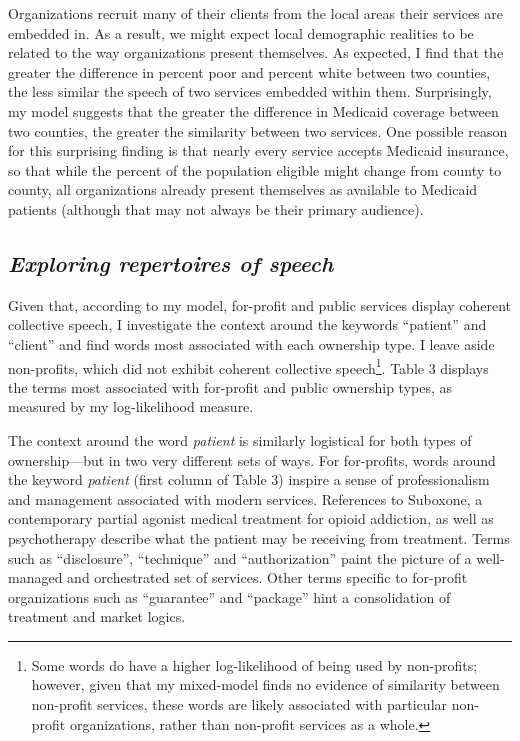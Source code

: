 \documentclass[
  12pt,
]{article}
\begin{document}
\vspace{12pt}

Organizations recruit many of their clients from the local areas their services are embedded in. As a result, we might expect local demographic realities to be related to the way organizations present themselves. As expected, I find that the greater the difference in percent poor and percent white between two counties, the less similar the speech of two services embedded within them. Surprisingly, my model suggests that the greater the difference in Medicaid coverage between two counties, the greater the similarity between two services. One possible reason for this surprising finding is that nearly every service accepts Medicaid insurance, so that while the percent of the population eligible might change from county to county, all organizations already present themselves as available to Medicaid patients (although that may not always be their primary audience).

\vspace{12pt}

\hypertarget{exploring-repertoires-of-speech}{%
\subsection{\texorpdfstring{\emph{Exploring repertoires of speech}}{Exploring repertoires of speech}}\label{exploring-repertoires-of-speech}}

Given that, according to my model, for-profit and public services display coherent collective speech, I investigate the context around the keywords ``patient'' and ``client'' and find words most associated with each ownership type. I leave aside non-profits, which did not exhibit coherent collective speech\footnote{Some words do have a higher log-likelihood of being used by non-profits; however, given that my mixed-model finds no evidence of similarity between non-profit services, these words are likely associated with particular non-profit organizations, rather than non-profit services as a whole.}. Table 3 displays the terms most associated with for-profit and public ownership types, as measured by my log-likelihood measure.

\vspace{12pt}

The context around the word \emph{patient} is similarly logistical for both types of ownership---but in two very different sets of ways. For for-profits, words around the keyword \emph{patient} (first column of Table 3) inspire a sense of professionalism and management associated with modern services. References to Suboxone, a contemporary partial agonist medical treatment for opioid addiction, as well as psychotherapy describe what the patient may be receiving from treatment. Terms such as ``disclosure'', ``technique'' and ``authorization'' paint the picture of a well-managed and orchestrated set of services. Other terms specific to for-profit organizations such as ``guarantee'' and ``package'' hint a consolidation of treatment and market logics.
\end{document}
